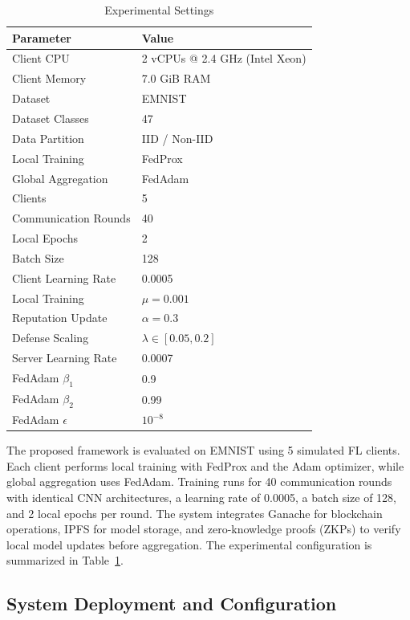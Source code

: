 \documentclass[conference, a4paper]{IEEEtran}
\begin{document}
\begin{table}[H]
\centering
\caption{Experimental Settings}
\label{tab:experimental_settings}
\begin{tabular}{ll}
\hline
\textbf{Parameter} & \textbf{Value} \\
\hline
Client CPU    & 2 vCPUs @ 2.4 GHz (Intel Xeon) \\
Client Memory & 7.0 GiB RAM \\
Dataset                & EMNIST \\
Dataset Classes        & 47 \\
Data Partition         & IID / Non-IID \\
Local Training         & FedProx \\
Global Aggregation     & FedAdam \\
Clients                & 5 \\
Communication Rounds   & 40 \\
Local Epochs           & 2 \\
Batch Size             & 128 \\
Client Learning Rate   & 0.0005 \\
Local Training         & $\mu=0.001$ \\
Reputation Update      & $\alpha=0.3$ \\
Defense Scaling        & $\lambda \in [0.05, 0.2]$ \\
Server Learning Rate   & 0.0007 \\
FedAdam $\beta_1$      & 0.9 \\
FedAdam $\beta_2$      & 0.99 \\
FedAdam $\epsilon$     & $10^{-8}$ \\
\hline
\end{tabular}
\end{table}

The proposed framework is evaluated on EMNIST using 5 simulated FL clients. Each client performs local training with FedProx and the Adam optimizer, while global aggregation uses FedAdam. Training runs for 40 communication rounds with identical CNN architectures, a learning rate of 0.0005, a batch size of 128, and 2 local epochs per round. The system integrates Ganache for blockchain operations, IPFS for model storage, and zero-knowledge proofs (ZKPs) to verify local model updates before aggregation. The experimental configuration is summarized in Table~\ref{tab:experimental_settings}.

\subsection{System Deployment and Configuration}
\end{document}
